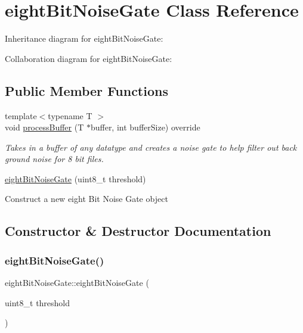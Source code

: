 \hypertarget{classeightBitNoiseGate}{}\section{eight\+Bit\+Noise\+Gate Class Reference}
\label{classeightBitNoiseGate}


Inheritance diagram for eight\+Bit\+Noise\+Gate\+:


Collaboration diagram for eight\+Bit\+Noise\+Gate\+:
\subsection*{Public Member Functions}
\begin{DoxyCompactItemize}
\item 
{\footnotesize template$<$typename T $>$ }\\void \hyperlink{classeightBitNoiseGate_a2ae5893814bd427a1607e933ee733c48}{process\+Buffer} (T $\ast$buffer, int buffer\+Size) override
\begin{DoxyCompactList}\small\item\em Takes in a buffer of any datatype and creates a noise gate to help filter out back ground noise for 8 bit files. \end{DoxyCompactList}\item 
\hyperlink{classeightBitNoiseGate_aa85cf07021d253d61b219a3de9cbaf9b}{eight\+Bit\+Noise\+Gate} (uint8\+\_\+t threshold)
\begin{DoxyCompactList}\small\item\em 
\begin{DoxyItemize}
\item Construct a new eight Bit Noise Gate object 
\end{DoxyItemize}\end{DoxyCompactList}\end{DoxyCompactItemize}


\subsection{Constructor \& Destructor Documentation}
\mbox{\label{classeightBitNoiseGate_aa85cf07021d253d61b219a3de9cbaf9b}} 
\subsubsection{\texorpdfstring{eight\+Bit\+Noise\+Gate()}{eightBitNoiseGate()}}
{\footnotesize\ttfamily eight\+Bit\+Noise\+Gate\+::eight\+Bit\+Noise\+Gate (\begin{DoxyParamCaption}\item[{uint8\+\_\+t}]{threshold }\end{DoxyParamCaption})}




